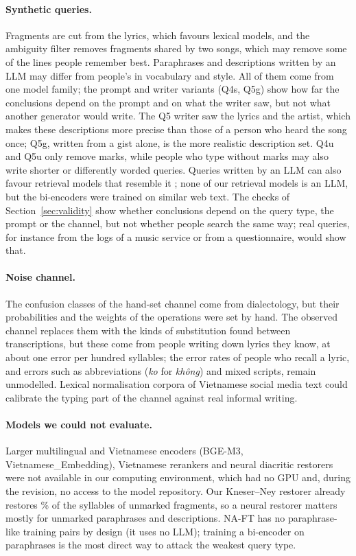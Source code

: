 \documentclass[11pt]{article}
\newcommand{\vi}[1]{\textit{#1}}          %
\newcommand{\Qfive}{Q5\xspace}
\newcommand{\Qfouru}{Q4u\xspace}
\newcommand{\Qfiveu}{Q5u\xspace}
\begin{document}
\paragraph{Synthetic queries.} Fragments are cut from the lyrics, which favours lexical models, and the
ambiguity filter removes fragments shared by two songs, which may remove some of the lines people remember
best. Paraphrases and descriptions written by an LLM may differ from people's in vocabulary and style. All of
them come from one model family; the prompt and writer variants (Q4s, Q5g) show how far the conclusions
depend on the prompt and on what the writer saw, but not what another generator would write. The \Qfive{}
writer saw the lyrics and the artist, which makes these descriptions more precise than those of a person who
heard the song once; Q5g, written from a gist alone, is the more realistic description set.
\Qfouru{} and \Qfiveu{} only remove marks, while people who type without marks may also write shorter or
differently worded queries. Queries written by an LLM can also favour retrieval models that resemble it
\citep{rahmani2024synthetic}; none of our retrieval models is an LLM, but the bi-encoders were trained on
similar web text. The checks of Section~\ref{sec:validity} show whether conclusions depend on the query type,
the prompt or the channel, but not whether people search the same way; real queries, for instance from the
logs of a music service or from a questionnaire, would show that.

\paragraph{Noise channel.} The confusion classes of the hand-set channel come from dialectology, but their
probabilities and the weights of the operations were set by hand. The observed channel replaces them with the
kinds of substitution found between transcriptions, but these come from people writing down lyrics they know,
at about one error per hundred syllables; the error rates of people who recall a lyric, and errors such as
abbreviations (\vi{ko} for \vi{không}) and mixed scripts, remain unmodelled. Lexical normalisation corpora of
Vietnamese social media text \citep{nguyen2024vilexnorm} could calibrate the typing part of the channel against
real informal writing.

\paragraph{Models we could not evaluate.} Larger multilingual and Vietnamese encoders (BGE-M3,
Vietnamese\_Embedding), Vietnamese rerankers \citep{dang2025viranker} and neural diacritic restorers
\citep{dang2020tdp} were not available in our computing environment, which had no GPU and, during the revision,
no access to the model repository. Our Kneser--Ney restorer already restores \RestoreAccAll\% of the syllables
of unmarked fragments, so a neural restorer matters mostly for unmarked paraphrases and descriptions. NA-FT has
no paraphrase-like training pairs by design (it uses no LLM); training a bi-encoder on paraphrases is the most
direct way to attack the weakest query type.
\end{document}
